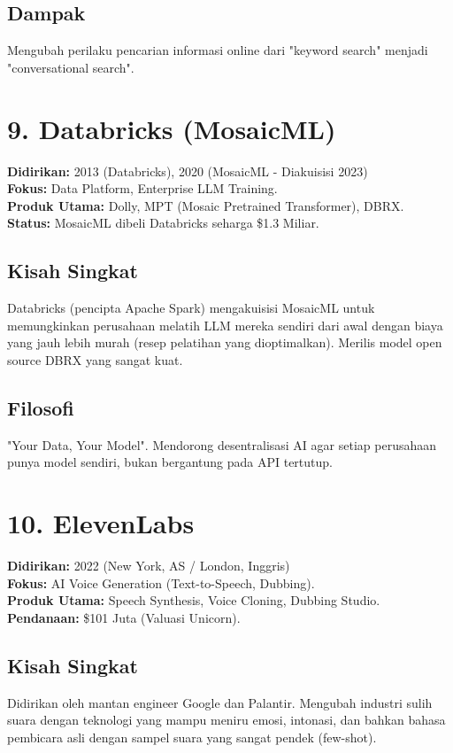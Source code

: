\subsection*{Dampak}
Mengubah perilaku pencarian informasi online dari "keyword search" menjadi "conversational search".

\section{9. Databricks (MosaicML)}
\textbf{Didirikan:} 2013 (Databricks), 2020 (MosaicML - Diakuisisi 2023) \\
\textbf{Fokus:} Data Platform, Enterprise LLM Training. \\
\textbf{Produk Utama:} Dolly, MPT (Mosaic Pretrained Transformer), DBRX. \\
\textbf{Status:} MosaicML dibeli Databricks seharga \$1.3 Miliar.

\subsection*{Kisah Singkat}
Databricks (pencipta Apache Spark) mengakuisisi MosaicML untuk memungkinkan perusahaan melatih LLM mereka sendiri dari awal dengan biaya yang jauh lebih murah (resep pelatihan yang dioptimalkan). Merilis model open source DBRX yang sangat kuat.

\subsection*{Filosofi}
"Your Data, Your Model". Mendorong desentralisasi AI agar setiap perusahaan punya model sendiri, bukan bergantung pada API tertutup.

\section{10. ElevenLabs}
\textbf{Didirikan:} 2022 (New York, AS / London, Inggris) \\
\textbf{Fokus:} AI Voice Generation (Text-to-Speech, Dubbing). \\
\textbf{Produk Utama:} Speech Synthesis, Voice Cloning, Dubbing Studio. \\
\textbf{Pendanaan:} \$101 Juta (Valuasi Unicorn).

\subsection*{Kisah Singkat}
Didirikan oleh mantan engineer Google dan Palantir. Mengubah industri sulih suara dengan teknologi yang mampu meniru emosi, intonasi, dan bahkan bahasa pembicara asli dengan sampel suara yang sangat pendek (few-shot).

